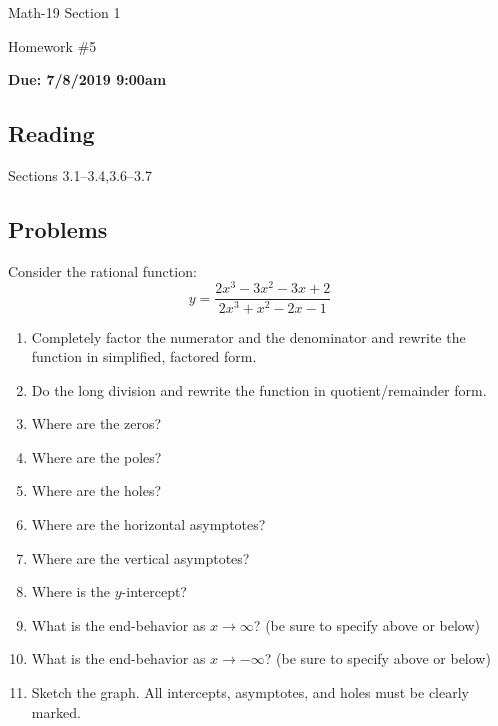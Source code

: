 \documentclass[letterpaper,12pt,fleqn]{article}
\begin{document}
\begin{center}
  \large
  Math-19 Section 1

  \Large
  Homework \#5

  \large
  \textbf{Due: 7/8/2019 9:00am}
\end{center}

\subsection*{Reading}

Sections 3.1--3.4,3.6--3.7

\subsection*{Problems}

Consider the rational function:
\[y=\frac{2x^3-3x^2-3x+2}{2x^3+x^2-2x-1}\]

\begin{enumerate}
\item Completely factor the numerator and the denominator and rewrite the function in simplified, factored form.
\item Do the long division and rewrite the function in quotient/remainder form.
\item Where are the zeros?
\item Where are the poles?
\item Where are the holes?
\item Where are the horizontal asymptotes?
\item Where are the vertical asymptotes?
\item Where is the \(y\)-intercept?
\item What is the end-behavior as \(x\to\infty\)? (be sure to specify above or below)
\item What is the end-behavior as \(x\to-\infty\)? (be sure to specify above or below)
\item Sketch the graph.  All intercepts, asymptotes, and holes must be clearly marked.
\end{enumerate}
\end{document}
